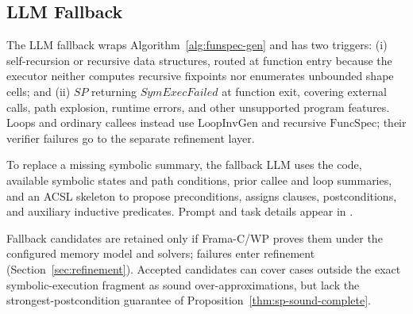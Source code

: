 \subsection{LLM Fallback}
\label{sec:llm-fallback}

The LLM fallback wraps Algorithm~\ref{alg:funspec-gen} and has two triggers: (i) self-recursion or recursive data structures, routed at function entry because the executor neither computes recursive fixpoints nor enumerates unbounded shape cells; and (ii) $\textit{SP}$ returning $\textit{SymExecFailed}$ at function exit, covering external calls, path explosion, runtime errors, and other unsupported program features. Loops and ordinary callees instead use $\mathrm{LoopInvGen}$ and recursive $\mathrm{FuncSpec}$; their verifier failures go to the separate refinement layer.

{To replace a missing symbolic summary, the fallback LLM uses the code, available symbolic states and path conditions, prior callee and loop summaries, and an ACSL skeleton to propose preconditions, assigns clauses, postconditions, and auxiliary inductive predicates. Prompt and task details appear in .}

Fallback candidates are retained only if Frama-C/WP proves them under the configured memory model and solvers; failures enter refinement (Section~\ref{sec:refinement}). Accepted candidates can cover cases outside the exact symbolic-execution fragment as sound over-approximations, but lack the strongest-postcondition guarantee of {Proposition~\ref{thm:sp-sound-complete}}.

